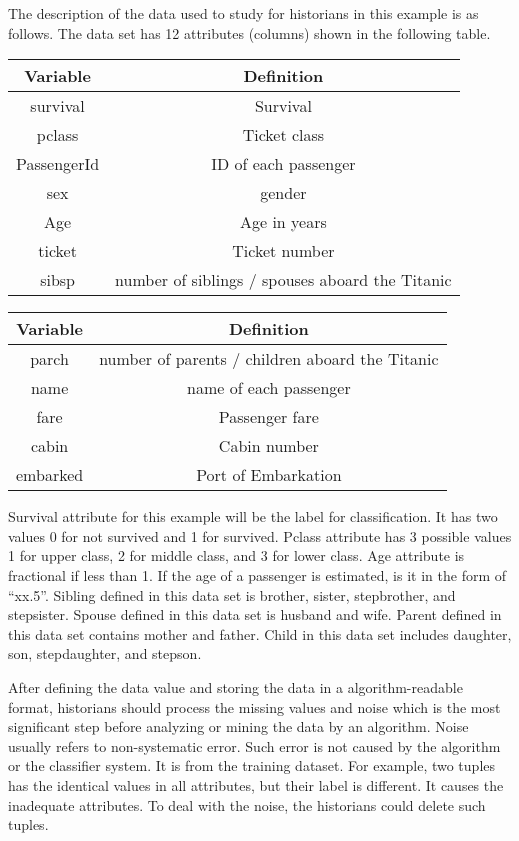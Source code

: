 \documentclass[sigconf]{acmart}
\begin{document}
\par
The description of the data used to study for historians in this example is as follows. The data set has 12 attributes (columns) shown in the following table\cite{C3}. 

\begin{center}
\begin{tabular}{c|c}
\hline
Variable & Definition\\
\hline
survival & Survival\\
pclass & Ticket class\\
PassengerId & ID of each passenger \\
sex & gender   \\
Age & Age in years   \\
ticket & Ticket number  \\
sibsp & number of siblings / spouses aboard the Titanic  \\
\hline
\end{tabular}
\end{center}

\begin{center}
\begin{tabular}{c|c}
\hline
Variable & Definition\\
\hline
parch & number of parents / children aboard the Titanic   \\
name & name of each passenger \\
fare &  Passenger fare	  \\
cabin &  Cabin number   \\
embarked &  Port of Embarkation \\
\hline
\end{tabular}
\end{center}

\par 
Survival attribute for this example will be the label for classification. It has two values 0 for not survived and 1 for survived. Pclass attribute has 3 possible values 1 for upper class, 2 for middle class, and 3 for lower class. Age attribute is fractional if less than 1. If the age of a passenger is estimated, is it in the form of ``xx.5''. Sibling defined in this data set is brother, sister, stepbrother, and stepsister. Spouse defined in this data set is husband and wife. Parent defined in this data set contains mother and father. Child in this data set includes daughter, son, stepdaughter, and stepson\cite{C3}. 

\par 
After defining the data value and storing the data in a algorithm-readable format, historians should process the missing values and noise which is the most significant step before analyzing or mining the data by an algorithm. Noise usually refers to non-systematic error. Such error is not caused by the algorithm or the classifier system. It is from the training dataset. For example, two tuples has the identical values in all attributes, but their label is different. It causes the inadequate attributes. To deal with the noise, the historians could delete such tuples. 
\end{document}
